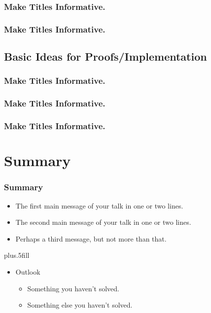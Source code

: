 \documentclass{beamer}
\begin{document}
\begin{frame}
  \frametitle{Make Titles Informative.}
\end{frame}

\begin{frame}
  \frametitle{Make Titles Informative.}
\end{frame}


\subsection{Basic Ideas for Proofs/Implementation}

\begin{frame}
  \frametitle{Make Titles Informative.}
\end{frame}

\begin{frame}
  \frametitle{Make Titles Informative.}
\end{frame}

\begin{frame}
  \frametitle{Make Titles Informative.}
\end{frame}



\section*{Summary}

\begin{frame}
  \frametitle<presentation>{Summary}

  \begin{itemize}
  \item
    The \alert{first main message} of your talk in one or two lines.
  \item
    The \alert{second main message} of your talk in one or two lines.
  \item
    Perhaps a \alert{third message}, but not more than that.
  \end{itemize}
  
  \vskip0pt plus.5fill
  \begin{itemize}
  \item
    Outlook
    \begin{itemize}
    \item
      Something you haven't solved.
    \item
      Something else you haven't solved.
    \end{itemize}
  \end{itemize}
\end{frame}
\end{document}
